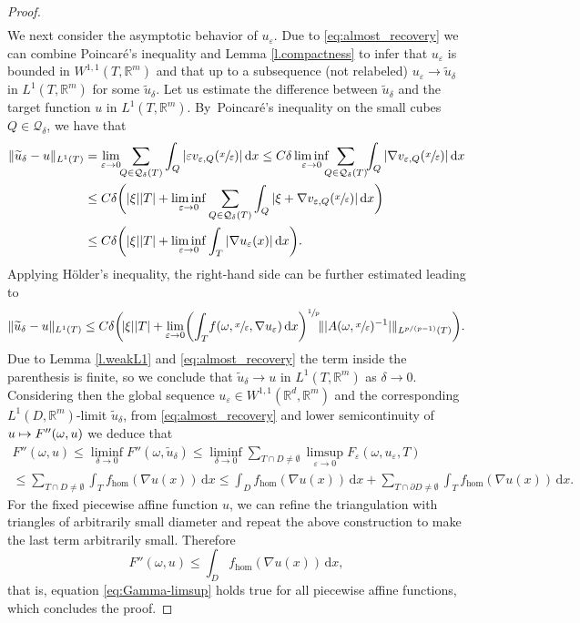 \documentclass[10pt]{amsart}
\def\mto{\mathchoice{\longmapsto}{\mapsto}{\mapsto}{\mapsto}}
\theoremstyle{definition}
\let\e\varepsilon
\let\w\omega
\newcommand{\dx}{\,\mathrm{d}x}
\newcommand{\R}{\mathbb{R}}
\begin{document}
\begin{proof}
\begin{multline}
\end{multline}
We next consider the asymptotic behavior of $u_{\e}$. Due to \eqref{eq:almost_recovery} we can combine Poincaré's inequality and Lemma \ref{l.compactness} to infer that $u_{\e}$ is bounded in $W^{1,1}(T,\R^m)$ and that up to a subsequence (not relabeled) $u_{\e}\to \widetilde{u}_{\delta}$ in $L^1(T,\R^m)$ for some $\widetilde{u}_{\delta}$. Let us estimate the difference between $\widetilde{u}_{\delta}$ and the target function $u$ in $L^1(T,\R^m)$. By~Poincaré's inequality on the small cubes $Q\in\mathcal{Q}_{\delta}$, we have that
\begin{align*}
\|\widetilde{u}_{\delta}-u\|_{L^1(T)}&=\lim_{\e\to 0}\hspace*{-1mm}\sum_{Q\in\mathcal{Q}_{\delta}(T)} \int_Q|\e v_{\e,Q}(\sfrac{x}{\e})|\dx\leq C\delta\liminf_{\e\to 0}\hspace*{-2mm}\sum_{Q\in\mathcal{Q}_{\delta}(T)}\hspace*{-1mm}\int_{Q}|\nabla v_{\e,Q}(\sfrac{x}{\e})|\dx
\\
&\leq C\delta \biggl(|\xi||T|+\liminf_{\e\to 0}\sum_{Q\in\mathcal{Q}_{\delta}(T)}\int_{Q}|\xi+\nabla v_{\e,Q}(\sfrac{x}{\e})|\dx\biggr)
\\
&\leq C\delta \biggl(|\xi||T|+\liminf_{\e\to 0}\int_{T}|\nabla u_{\e}(x)|\dx\biggr).
\end{align*}
Applying Hölder's inequality, the right-hand side can be further estimated leading to
\begin{equation*}
\|\widetilde{u}_{\delta}-u\|_{L^1(T)}\leq C\delta\biggl(\!|\xi||T|+\lim_{\e\to 0}\biggl(\int_{T}\!f(\w,\sfrac{x}{\e},\nabla u_{\e})\dx\biggr)^{\sfrac{1}{p}}\!\||A(\w,\sfrac{x}{\e})^{-1}|\|_{L^{p/(p-1)}(T)}\biggr).
\end{equation*}
Due to Lemma \ref{l.weakL1} and \eqref{eq:almost_recovery} the term inside the parenthesis is finite, so we conclude that $\widetilde{u}_{\delta}\to u$ in $L^1(T,\R^m)$ as $\delta\to 0$. Considering then the global sequence $u_{\e}\in W^{1,1}(\R^d,\R^m)$ and the corresponding $L^1(D,\R^m)$-limit $\widetilde{u}_{\delta}$, from \eqref{eq:almost_recovery} and lower semicontinuity of $u\mto F''(\w,u)$ we deduce that
\begin{multline*}
F''(\w,u)\leq\liminf_{\delta\to 0}F''(\w,\widetilde{u}_{\delta})\leq\liminf_{\delta\to 0} \sum_{T\cap D\neq\emptyset}\limsup_{\e\to 0}F_{\e}(\w,u_{\e},T)
\\
\leq  \sum_{T\cap D\neq\emptyset}\int_Tf_{\hom}(\nabla u(x))\dx
\leq \int_D f_{\hom}(\nabla u(x))\dx+\sum_{T\cap\partial D\neq\emptyset}\int_Tf_{\hom}(\nabla u(x))\dx.
\end{multline*}
For the fixed piecewise affine function $u$, we can refine the triangulation with triangles of arbitrarily small diameter and repeat the above construction to make the last term arbitrarily small. Therefore
\begin{equation*}
F''(\w,u)\leq \int_{D}f_{\hom}(\nabla u(x))\dx,
\end{equation*}
that is, equation \eqref{eq:Gamma-limsup} holds true for all piecewise affine functions, which concludes the proof.
\end{proof}
\end{document}
